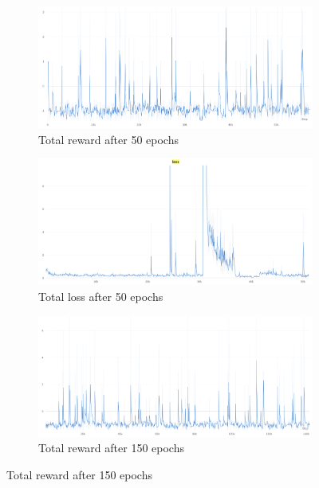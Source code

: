\documentclass{scrartcl}
\begin{document}
\begin{figure}
  \centering
  \begin{subfigure}[b]{0.45\textwidth}
      \centering
      \includegraphics[width=\textwidth]{img/rewards_50_epochs.png}
      \caption{Total reward after 50 epochs}
      \label{fig:s_mer}
  \end{subfigure}
  \hfill
  \begin{subfigure}[b]{0.45\textwidth}
      \centering
      \includegraphics[width=\textwidth]{img/loss_50_epochs.png}
      \caption{Total loss after 50 epochs}
      \label{fig:s_mel}
  \end{subfigure}
  \hfill
  \begin{subfigure}[b]{0.45\textwidth}
      \centering
      \includegraphics[width=\textwidth]{img/rewards.png}
      \caption{Total reward after 150 epochs} 

\end{subfigure}
\end{figure}
\end{document}
